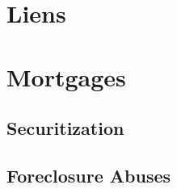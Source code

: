 

\section{Liens}



\begin{questions}

\end{questions}



\begin{questions}

\end{questions}



\section{Mortgages}



\subsection{Securitization}



\subsection{Foreclosure Abuses}





\begin{questions}

\end{questions}


